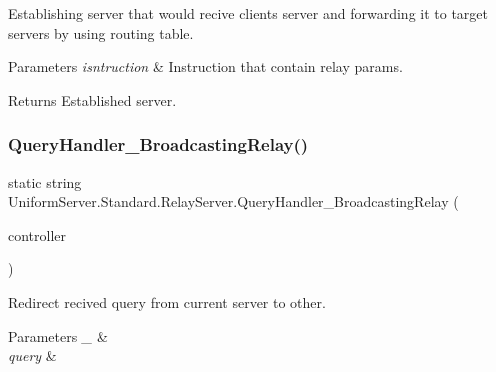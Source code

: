 Establishing server that would recive client\textquotesingle{}s server and forwarding it to target servers by using routing table. 


\begin{DoxyParams}{Parameters}
{\em isntruction} & Instruction that contain relay params.\\
\hline
\end{DoxyParams}
\begin{DoxyReturn}{Returns}
Established server.
\end{DoxyReturn}
\mbox{\label{class_uniform_server_1_1_standard_1_1_relay_server_a5306cb2ee3b40c50785283c4d4e5d387}} 
\subsubsection{\texorpdfstring{Query\+Handler\+\_\+\+Broadcasting\+Relay()}{QueryHandler\_BroadcastingRelay()}}
{\footnotesize\ttfamily static string Uniform\+Server.\+Standard.\+Relay\+Server.\+Query\+Handler\+\_\+\+Broadcasting\+Relay (\begin{DoxyParamCaption}\item[{\mbox{\hyperlink{class_pipes_provider_1_1_server_1_1_transmission_controllers_1_1_broadcasting_server_transmission_controller}{Broadcasting\+Server\+Transmission\+Controller}}}]{controller }\end{DoxyParamCaption})\hspace{0.3cm}{\ttfamily [static]}}



Redirect recived query from current server to other. 


\begin{DoxyParams}{Parameters}
{\em \+\_\+} & \\
\hline
{\em query} & \\
\hline
\end{DoxyParams}
\mbox{\label{class_uniform_server_1_1_standard_1_1_relay_server_a96a666ec31626f2e1a3f2f1d4d444366}} 
